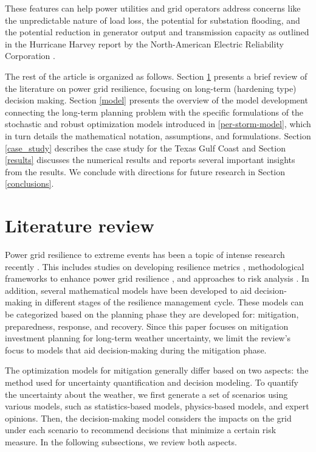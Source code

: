 \documentclass[authoryear,preprint,review,12pt]{elsarticle}\usepackage{amssymb}
\begin{document}
These features can help power utilities and grid operators address concerns like the unpredictable nature of load loss, the potential for substation flooding, and the potential reduction in generator output and transmission capacity as outlined in the Hurricane Harvey report by the North-American Electric Reliability Corporation \cite{NERC2018}.

The rest of the article is organized as follows. Section \ref{lit_review} presents a brief review of the literature on power grid resilience, focusing on long-term (hardening type) decision making. Section \ref{model} presents the overview of the model development connecting the long-term planning problem with the specific formulations of the stochastic and robust optimization models introduced in \ref{per-storm-model}, which in turn details the mathematical notation, assumptions, and formulations. Section \ref{case_study} describes the case study for the Texas Gulf Coast and Section \ref{results} discusses the numerical results and reports several important insights from the results. We conclude with directions for future research in Section \ref{conclusions}.

\section{Literature review} \label{lit_review}
Power grid resilience to extreme events has been a topic of intense research recently \cite{framework_grid_resilience}. This includes studies on developing resilience metrics \cite{AHMADIAN2020106977, Panteli_metrics, hosseini2016review,golan_dimensions_2026}, methodological frameworks to enhance power grid resilience \cite{Panteli_framework, WINKLER2010323}, and approaches to risk analysis \cite{framework_5}. In addition, several mathematical models have been developed to aid decision-making in different stages of the resilience management cycle. These models can be categorized based on the planning phase they are developed for: mitigation, preparedness, response, and recovery. Since this paper focuses on mitigation investment planning for long-term weather uncertainty, we limit the review's focus to models that aid decision-making during the mitigation phase.

The optimization models for mitigation generally differ based on two aspects: the method used for uncertainty quantification and decision modeling. To quantify the uncertainty about the weather, we first generate a set of scenarios using various models, such as statistics-based models, physics-based models, and expert opinions. Then, the decision-making model considers the impacts on the grid under each scenario to recommend decisions that minimize a certain risk measure. In the following subsections, we review both aspects. 
\end{document}
